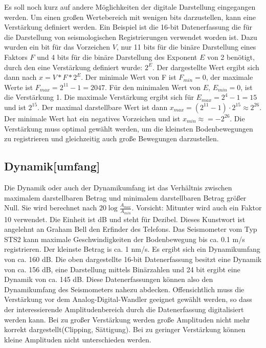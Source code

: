 Es soll noch kurz auf andere Möglichkeiten der digitale Darstellung eingegangen werden. Um einen großen Wertebereich mit wenigen bits darzustellen, kann eine Verstärkung definiert werden. Ein Beispiel ist die 16-bit Datenerfassung die für die Darstellung von seismologischen Registrierungen verwendet worden ist. Dazu wurden ein bit für das Vorzeichen $V$, nur 11 bits für die binäre Darstellung eines Faktors $F$  und 4 bits für die binäre Darstellung des Exponent $E$ von 2 benötigt, durch den eine Verstärkung definiert wurde: $2^{E}$. Der dargestellte Wert ergibt sich dann nach $x = V*F*2^E$. Der minimale Wert von F ist  $F_{min}=0$, der maximale Werte ist $F_{max}=2^{11}-1 = 2047$. Für den minimalen Wert von $E$, $E_{min}=0$, ist die Verstärkung 1. Die maximale Verstärkung ergibt sich für $E_{max}=2^{4}-1=15$ und ist $2^{15}$. Der maximal darstellbare Wert ist dann  $x_{max}=(2^{11}-1) \cdot 2^{15} \approx 2^{26}$. Der minimale Wert hat ein negatives Vorzeichen und ist $x_{min} \approx = -2^{26}$. Die Verstärkung muss optimal gewählt werden, um die kleinsten Bodenbewegungen zu registrieren und gleichzeitig auch große Bewegungen darzustellen.

\subsection{Dynamik[umfang]}
Die Dynamik oder auch der Dynamikumfang ist das Verhältnis zwischen maximalem darstellbaren Betrag und minimalem darstellbaren Betrag größer Null. Sie wird berechnet nach  $20\log \frac{A_{max}}{A_{min}}$. Vorsicht: Mitunter wird auch ein Faktor 10 verwendet. Die  Einheit ist dB und steht für Dezibel. Dieses Kunstwort ist angelehnt an Graham Bell den Erfinder des Telefons.  Das Seismometer vom Typ STS2 kann maximale Geschwindigkeiten der Bodenbewegung bis ca. 0.1 m/s registrieren. Der kleinste Betrag is ca. 1 nm/s. Es ergibt sich ein Dynamikumfang von ca. 160 dB. Die oben dargestellte 16-bit Datenerfassung besitzt eine Dynamik von ca. 156 dB, eine Darstellung mittels Binärzahlen und 24 bit ergibt eine Dynamik von ca. 145 dB. Diese Datenerfassungen können also den Dynamikumfang des Seismometers nahezu abdecken. Offensichtlich muss die Verstärkung vor dem Analog-Digital-Wandler geeignet gewählt werden, so dass der interessierende Amplitudenbereich durch die Datenerfassung digitalisiert werden kann. Bei zu großer Verstärkung werden große Amplituden nicht mehr korrekt dargestellt(Clipping, Sättigung).  Bei zu geringer Verstärkung können kleine Amplituden nicht unterschieden werden. 

